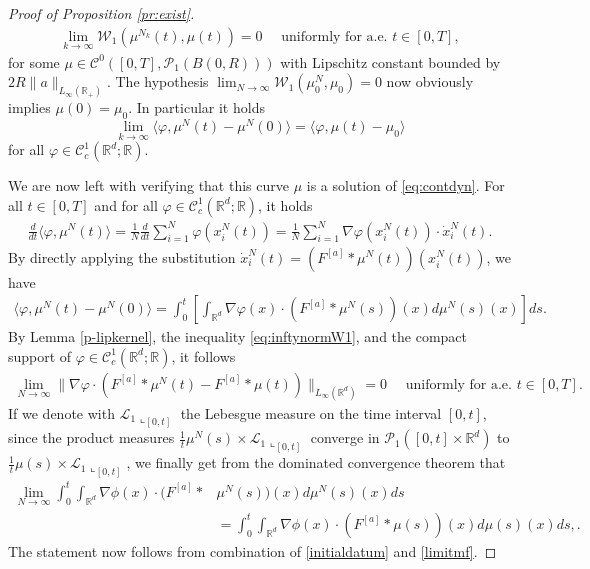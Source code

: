 \documentclass[A4paper,11pt]{article}
\theoremstyle{definition}
\newcommand{\R}{\mathbb{R}}
\newcommand{\W}{\mathcal{W}}
\newcommand{\Fun}[1]{F^{[#1]}}
\begin{document}
\begin{proof}[Proof of Proposition \ref{pr:exist}]
\begin{align}\label{eq:unifconv}
\lim_{k \rightarrow \infty}\W_1(\mu^{N_k}(t),\mu(t)) = 0 \quad \text{ uniformly for a.e. } t \in [0,T],
\end{align}
for some $\mu \in \mathcal{C}^0([0,T],\mathcal{P}_1(B(0,R)))$ with Lipschitz constant bounded by $2R\|a\|_{L_{\infty}(\R_+)}$. The hypothesis $\lim_{N\rightarrow\infty}\W_1(\mu^N_0,\mu_0) = 0$ now obviously implies $\mu(0) = \mu_0$. In particular it holds
\begin{equation}\label{initialdatum}
\lim_{k\to \infty} \langle \varphi, \mu^N(t) - \mu^N(0) \rangle  =  \langle \varphi, \mu(t) - \mu_0 \rangle
\end{equation}
for all $\varphi \in \mathcal{C}^1_c(\R^d;\R)$.


We are now left with verifying that this curve $\mu$ is a solution of \eqref{eq:contdyn}. For all $t \in [0,T]$ and for all $\varphi \in \mathcal{C}^1_c(\R^d;\R)$, it holds
\begin{align*}
\frac{d}{dt}\langle \varphi, \mu^N(t) \rangle = \frac{1}{N}\frac{d}{dt} \sum^N_{i = 1} \varphi(x^N_i(t)) = \frac{1}{N} \sum^N_{i = 1} \nabla\varphi(x^N_i(t)) \cdot \dot{x}_i^N(t).
\end{align*}
By directly applying the substitution $\dot{x}_i^N(t) = (\Fun{a}*\mu^N(t))(x^N_i(t))$, we have
\begin{align*}
\langle \varphi, \mu^N(t) - \mu^N(0) \rangle = \int^t_0 \left[ \int_{\R^d}\nabla \varphi(x) \cdot (\Fun{a}*\mu^N(s))(x) d\mu^N(s)(x) \right] ds.
\end{align*}
By Lemma \ref{p-lipkernel}, the inequality \eqref{eq:inftynormW1}, and the compact support of $\varphi \in \mathcal{C}^1_c(\R^d;\R)$, it follows
\begin{align*}
\lim_{N \rightarrow \infty} \|\nabla\varphi \cdot (\Fun{a}*\mu^N(t) - \Fun{a}*\mu(t))\|_{L_{\infty}(\R^d)} = 0 \quad \text{ uniformly for a.e. } t \in [0,T].
\end{align*}
If we denote with $\mathcal L_1\llcorner_{[0,t]}$ the Lebesgue measure on the time interval $[0,t]$, since the product measures $\frac{1}{t} \mu^{N}(s) \times \mathcal L_1\llcorner_{[0,t]}$ converge in $\mathcal P_1([0,t] \times \mathbb R^{d})$ to $\frac{1}{t} \mu(s) \times \mathcal L_1\llcorner_{[0,t]}$, we finally get from the dominated convergence theorem that
\begin{align}
\lim_{N \to \infty} \int_0^{t} \int_{\mathbb R^{d}} \nabla \phi(x) \cdot (\Fun{a}*&\mu^N(s))(x) d\mu^N(s)(x) ds  \nonumber \\
&=  \int_0^{t} \int_{\mathbb R^{d}} \nabla \phi(x) \cdot (\Fun{a}*\mu(s))(x) d \mu(s)(x) ds, \label{limitmf}.
\end{align}
The statement now follows from combination of \eqref{initialdatum} and \eqref{limitmf}.  
\end{proof}
\end{document}
